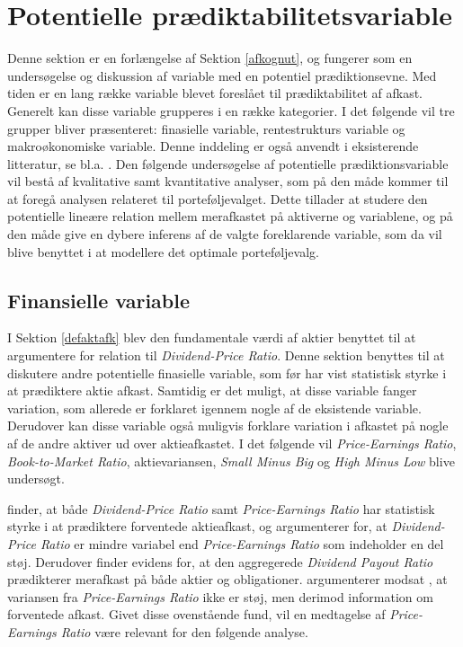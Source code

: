 \documentclass[
  a4paper,
  oneside]{memoir}
\begin{document}
\hypertarget{potpradik}{%
\section{Potentielle prædiktabilitetsvariable}\label{potpradik}}

Denne sektion er en forlængelse af Sektion \ref{afkognut}, og fungerer som en undersøgelse og diskussion af variable med en potentiel prædiktionsevne. Med tiden er en lang række variable blevet foreslået til prædiktabilitet af afkast. Generelt kan disse variable grupperes i en række kategorier. I det følgende vil tre grupper bliver præsenteret: finasielle variable, rentestrukturs variable og makroøkonomiske variable. Denne inddeling er også anvendt i eksisterende litteratur, se bl.a. \citep{Koijen2011}. Den følgende undersøgelse af potentielle prædiktionsvariable vil bestå af kvalitative samt kvantitative analyser, som på den måde kommer til at foregå analysen relateret til porteføljevalget. Dette tillader at studere den potentielle lineære relation mellem merafkastet på aktiverne og variablene, og på den måde give en dybere inferens af de valgte foreklarende variable, som da vil blive benyttet i at modellere det optimale porteføljevalg.

\hypertarget{finansielle-variable}{%
\subsection{Finansielle variable}\label{finansielle-variable}}

I Sektion \ref{defaktafk} blev den fundamentale værdi af aktier benyttet til at argumentere for relation til \emph{Dividend-Price Ratio}. Denne sektion benyttes til at diskutere andre potentielle finasielle variable, som før har vist statistisk styrke i at prædiktere aktie afkast. Samtidig er det muligt, at disse variable fanger variation, som allerede er forklaret igennem nogle af de eksistende variable. Derudover kan disse variable også muligvis forklare variation i afkastet på nogle af de andre aktiver ud over aktieafkastet. I det følgende vil \emph{Price-Earnings Ratio}, \emph{Book-to-Market Ratio}, aktievariansen, \emph{Small Minus Big} og \emph{High Minus Low} blive undersøgt.

\citep{Fama1988} finder, at både \emph{Dividend-Price Ratio} samt \emph{Price-Earnings Ratio} har statistisk styrke i at prædiktere forventede aktieafkast, og argumenterer for, at \emph{Dividend-Price Ratio} er mindre variabel end \emph{Price-Earnings Ratio} som indeholder en del støj. Derudover finder \citep{Lamont1998} evidens for, at den aggregerede \emph{Dividend Payout Ratio} prædikterer merafkast på både aktier og obligationer. \citep{Lamont1998} argumenterer modsat \citep{Fama1988}, at variansen fra \emph{Price-Earnings Ratio} ikke er støj, men derimod information om forventede afkast. Givet disse ovenstående fund, vil en medtagelse af \emph{Price-Earnings Ratio} være relevant for den følgende analyse.
\end{document}
